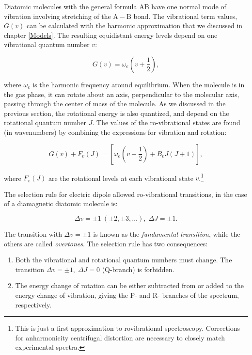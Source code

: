 \documentclass[
  9pt,
]{extbook}
\providecommand{\tightlist}{%
  \setlength{\itemsep}{0pt}\setlength{\parskip}{0pt}}
\theoremstyle{definition}
\theoremstyle{definition}
\theoremstyle{definition}
\theoremstyle{remark}
\begin{document}
Diatomic molecules with the general formula \(\mathrm{AB}\) have one normal mode of vibration involving stretching of the \(\mathrm{A}-\mathrm{B}\) bond. The vibrational term values, \(G(v)\) can be calculated with the harmonic approximation that we discussed in chapter \ref{Models}. The resulting equidistant energy levels depend on one vibrational quantum number \(v\):

\begin{equation}
G(v) = \omega_e \left( v + \frac{1}{2} \right),
\label{eq:vib1}
\end{equation}

where \(\omega_e\) is the harmonic frequency around equilibrium. When the molecule is in the gas phase, it can rotate about an axis, perpendicular to the molecular axis, passing through the center of mass of the molecule. As we discussed in the previous section, the rotational energy is also quantized, and depend on the rotational quantum number \(J\). The values of the ro-vibrational states are found (in wavenumbers) by combining the expressions for vibration and rotation:

\begin{equation}
G(v)+F_{v}(J)=\left[\omega_e \left(v + \frac{1}{2} \right) +B_{v}J(J+1)\right],
\label{eq:vib2}
\end{equation}

where \(F_{v}(J)\) are the rotational levels at each vibrational state \(v\).\footnote{This is just a first approximation to rovibrational spectroscopy. Corrections for anharmonicity centrifugal distortion are necessary to closely match experimental spectra.}

The selection rule for electric dipole allowed ro-vibrational transitions, in the case of a diamagnetic diatomic molecule is:

\begin{equation} 
\Delta v=\pm 1\ (\pm 2,\pm 3,\ldots),\; \Delta J=\pm 1.
\label{eq:vib3}
\end{equation}

The transition with \(\Delta v =\pm 1\) is known as the \emph{fundamental transition}, while the others are called \emph{overtones}. The selection rule has two consequences:

\begin{enumerate}
\def\labelenumi{\arabic{enumi}.}
\tightlist
\item
  Both the vibrational and rotational quantum numbers must change. The transition \(\Delta v=\pm 1,\;\Delta J=0\) (Q-branch) is forbidden.
\item
  The energy change of rotation can be either subtracted from or added to the energy change of vibration, giving the P- and R- branches of the spectrum, respectively.
\end{enumerate}
\end{document}
